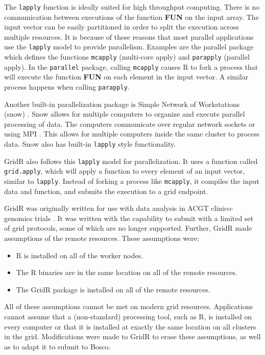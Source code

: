 The \texttt{lapply} function is ideally suited for high throughput computing.  There is no communication between executions of the function \textbf{FUN} on the input array.  The input vector can be easily partitioned in order to split the execution across multiple resources.  It is because of these reasons that most parallel applications use the \texttt{lapply} model to provide parallelism.  Examples are the parallel package which defines the functions \texttt{mcapply} (multi-core apply) and \texttt{parapply} (parallel apply). In the \texttt{parallel} package, calling \texttt{mcapply} causes R to fork a process that will execute the function \textbf{FUN} on each element in the input vector.  A similar process happens when calling \texttt{parapply}. 

Another built-in parallelization package is Simple Network of Workstations (snow) \cite{rlangsnow}.  Snow allows for multiple computers to organize and execute parallel processing of data.  The computers communicate over regular network sockets or using MPI \cite{gropp1999using}.  This allows for multiple computers inside the same cluster to process data.  Snow also has built-in \texttt{lapply} style functionality.

GridR also follows this \texttt{lapply} model for parallelization.  It uses a function called \texttt{grid.apply}, which will apply a function to every element of an input vector, similar to \texttt{lapply}.  Instead of forking a process like \texttt{mcapply}, it compiles the input data and function, and submits the execution to a grid endpoint.

GridR was originally written for use with data analysis in ACGT clinico-genomics trials \cite{wegener2007gridr}.  It was written with the capability to submit with a limited set of grid protocols, some of which are no longer supported.  Further, GridR made assumptions of the remote resources.  These assumptions were:

\begin{itemize}
\item R is installed on all of the worker nodes.
\item The R binaries are in the same location on all of the remote resources.
\item The GridR package is installed on all of the remote resources.
\end{itemize}

All of these assumptions cannot be met on modern grid resources.  Applications cannot assume that a (non-standard) processing tool, such as R, is installed on every computer or   that it is installed at exactly the same location on all clusters in the grid.  Modifications were made to GridR to erase these assumptions, as well as to adapt it to submit to Bosco.

